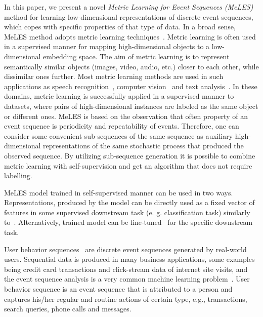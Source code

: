 \documentclass{article}
\begin{document}
In this paper, we present a novel \emph{Metric Learning for Event Sequences (MeLES)} method for learning low-dimensional representations of discrete event sequences, which copes with specific properties of that type of data. In a broad sense, MeLES method adopts metric learning techniques~\cite{Xing2002DistanceML, Hadsell2006DimensionalityRB}. Metric learning is often used in a supervised manner for mapping high-dimensional objects to a low-dimensional embedding space. The aim of metric learning is to represent semantically similar objects (images, video, audio, etc.) closer to each other, while dissimilar ones further. Most metric learning methods are used in such applications as speech recognition~\cite{Wan2018GeneralizedEL}, computer vision~\cite{Schroff2015FaceNetAU, Mao2019MetricLF} and text analysis~\cite{Reimers2019SentenceBERTSE}. In these domains, metric learning is successfully applied in a supervised manner to datasets, where pairs of high-dimensional instances are labeled as the same object or different ones.
MeLES is based on the observation that often property of an event sequence is periodicity and repeatability of events. Therefore, one can consider some convenient sub-sequences of the same sequence as auxiliary high-dimensional representations of the same stochastic process that produced the observed sequence. By utilizing sub-sequence generation it is possible to combine metric learning with self-supervision and get an algorithm that does not require labelling.

MeLES model trained in self-supervised manner can be used in two ways. Representations, produced by the model can be directly used as a fixed vector of features in some supervised downstream task (e. g. classification task) similarly to~\cite{Mikolov2013EfficientEO}. Alternatively, trained model can be fine-tuned~\cite{Devlin2019BERTPO} for the specific downstream task.

User behavior sequences~\cite{Ni2018PerceiveYU} are discrete event sequences generated by real-world users. Sequential data is produced in many business applications, some examples being credit card transactions and click-stream data of internet site visits, and the event sequence analysis is a very common machine learning problem~\cite{Laxman2008StreamPU, Wiese2009CreditCT, Zhang2017CreditRA, Bigon2019PredictionIV}. User behavior sequence is an event sequence that is attributed to a person and captures his/her regular and routine actions of certain type, e.g., transactions, search queries, phone calls and messages.
\end{document}
